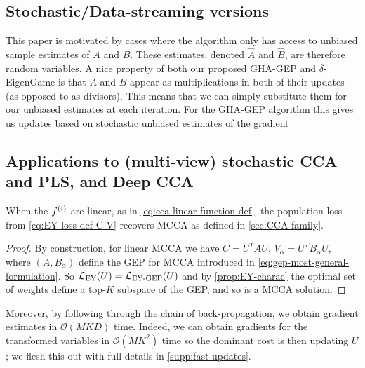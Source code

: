 \subsection{Stochastic/Data-streaming versions}

This paper is motivated by cases where the algorithm only has access to unbiased sample estimates of $A$ and $B$. These estimates, denoted $\hat{A}$ and $\hat{B}$, are therefore random variables. A nice property of both our proposed GHA-GEP and $\delta$-EigenGame is that $A$ and $B$ appear as multiplications in both of their updates (as opposed to as divisors). This means that we can simply substitute them for our unbiased estimates at each iteration. For the GHA-GEP algorithm this gives us updates based on stochastic unbiased estimates of the gradient


\subsection{Applications to (multi-view) stochastic CCA and PLS, and Deep CCA}
\begin{lemma}
    When the $f^{(i)}$ are linear, as in \cref{eq:cca-linear-function-def}, the population loss from \cref{eq:EY-loss-def-C-V} recovers MCCA as defined in \cref{sec:CCA-family}. %
\end{lemma}
\begin{proof}
    By construction, for linear MCCA we have $C = U^T A U,\, V_\alpha=U^T B_\alpha U$, where $(A, B_\alpha)$ define the GEP for MCCA introduced in \cref{eq:gep-most-general-formulation}.
    So $\mathcal{L}_\text{EY}(U) = \mathcal{L}_\text{EY-GEP}(U)$ and by \cref{prop:EY-charac} the optimal set of weights define a top-$K$ subspace of the GEP, and so is a MCCA solution.
\end{proof}

Moreover, by following through the chain of back-propagation, we obtain gradient estimates in $\mathcal{O}(MKD)$ time.
Indeed, we can obtain gradients for the transformed variables in $\mathcal{O}(M K^2)$ time so the dominant cost is then updating $U$; we flesh this out with full details in \cref{supp:fast-updates}.

